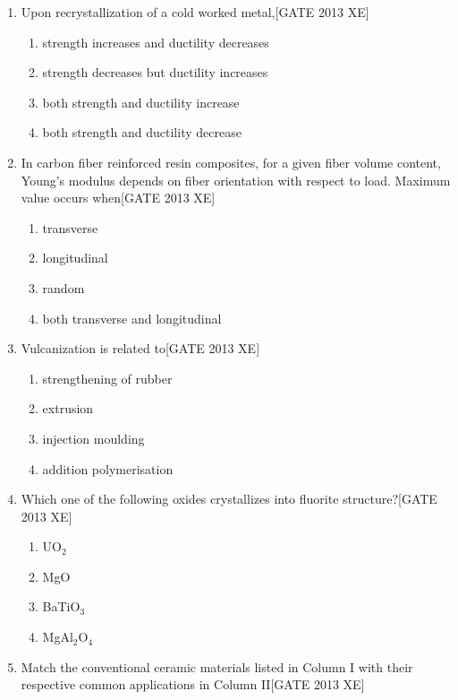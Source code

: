\documentclass[journal,12pt,onecolumn]{IEEEtran}
\theoremstyle{remark}
\begin{document}
\begin{enumerate}
\item Upon recrystallization of a cold worked metal,\hfill[GATE 2013 XE]
\begin{multicols}{2}
\begin{enumerate}
\item strength increases and ductility decreases
\item strength decreases but ductility increases
\item both strength and ductility increase
\item both strength and ductility decrease
\end{enumerate}
\end{multicols}

\item  In carbon fiber reinforced resin composites, for a given fiber volume content, Young’s modulus depends on fiber orientation with respect to load. Maximum value occurs when\hfill[GATE 2013 XE]
\begin{multicols}{2}
\begin{enumerate}
\item transverse
\item longitudinal
\item random
\item both transverse and longitudinal
\end{enumerate}
\end{multicols}

\item Vulcanization is related to\hfill[GATE 2013 XE]
\begin{multicols}{2}
\begin{enumerate}
\item strengthening of rubber
\item extrusion
\item injection moulding
\item addition polymerisation
\end{enumerate}
\end{multicols}

\item Which one of the following oxides crystallizes into fluorite structure?\hfill[GATE 2013 XE]
\begin{multicols}{2}
\begin{enumerate}
\item UO$_2$
\item MgO
\item BaTiO$_3$
\item MgAl$_2$O$_4$
\end{enumerate}
\end{multicols}
\item Match the conventional ceramic materials listed in Column I with their respective common applications in Column II\hfill[GATE 2013 XE]


\end{enumerate}
\end{document}

